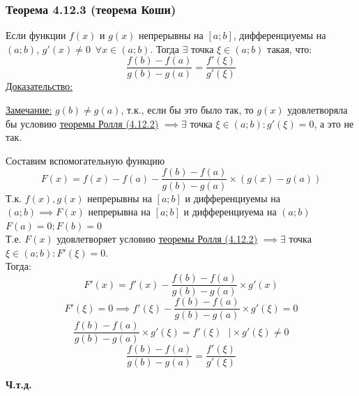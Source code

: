 \documentclass[12pt]{article}
\begin{document}
    \subsubsection*{Теорема 4.12.3 (теорема Коши)}\label{th:4.12.3}
    Если функции $f(x)$ и $g(x)$ непрерывны на $[a;b]$, дифференциуемы на $(a;b)$, $g'(x) \ne 0 \,\,\, \forall x \in (a;b)$. Тогда $\exists$ точка $\xi \in (a;b)$ такая, что:
    \[ \frac{f(b) - f(a)}{g(b) - g(a)} = \frac{f'(\xi)}{g'(\xi)} \]
    \underline{Доказательство:}
    \begin{adjustwidth}{1.5em}{1.5em}
        \underline{Замечание:} $g(b) \ne g(a)$, т.к., если бы это было так, то $g(x)$ удовлетворяла бы условию \hyperref[th:4.12.2]{теоремы Ролля (4.12.2)} $\implies \exists$ точка $\xi \in (a;b) : g'(\xi) = 0$, а это не так.\par\noindent
        Составим вспомогательную функцию
        \[ F(x) = f(x) - f(a) - \frac{f(b) - f(a)}{g(b) - g(a)} \times (g(x) - g(a)) \]
        Т.к. $f(x), g(x)$ непрерывны на $[a;b]$ и дифференциуемы на $(a;b) \implies F(x)$ непрерывна на $[a;b]$ и дифференциуема на $(a;b)$\\
        $F(a) = 0; F(b) = 0$\\
        Т.е. $F(x)$ удовлетворяет условию \hyperref[th:4.12.2]{теоремы Ролля (4.12.2)} $\implies \exists$ точка $\xi \in (a;b) : F'(\xi) = 0$.\\
        Тогда:
        \[ F'(x) = f'(x) - \frac{f(b) - f(a)}{g(b) - g(a)} \times g'(x) \]
        \[ F'(\xi) = 0 \implies f'(\xi) - \frac{f(b) - f(a)}{g(b) - g(a)} \times g'(\xi) = 0 \]
        \[ \frac{f(b) - f(a)}{g(b) - g(a)} \times g'(\xi) = f'(\xi) \,\,\,\, \Big| \times g'(\xi) \ne 0 \]
        \[ \frac{f(b) - f(a)}{g(b) - g(a)} = \frac{f'(\xi)}{g'(\xi)} \]
        \begin{center}
            \textbf{Ч.т.д.}
        \end{center}
    \end{adjustwidth}
    
\end{document}
